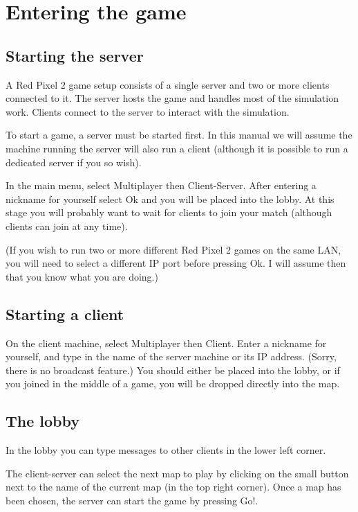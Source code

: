 \documentclass[a4paper]{article}
\begin{document}
\section{Entering the game}


\subsection{Starting the server}

A Red Pixel 2 game setup consists of a single server and two or more
clients connected to it.  The server hosts the game and handles most
of the simulation work.  Clients connect to the server to interact
with the simulation.

To start a game, a server must be started first.  In this manual we
will assume the machine running the server will also run a client
(although it is possible to run a dedicated server if you so wish).

In the main menu, select \textsf{Multiplayer} then
\textsf{Client-Server}.  After entering a nickname for yourself select
\textsf{Ok} and you will be placed into the lobby.  At this stage you
will probably want to wait for clients to join your match (although
clients can join at any time).

(If you wish to run two or more different Red Pixel 2 games on the
same LAN, you will need to select a different IP port before pressing
\textsf{Ok}.  I will assume then that you know what you are doing.)


\subsection{Starting a client}

On the client machine, select \textsf{Multiplayer} then
\textsf{Client}.  Enter a nickname for yourself, and type in the name
of the server machine or its IP address.  (Sorry, there is no
broadcast feature.)  You should either be placed into the lobby, or if
you joined in the middle of a game, you will be dropped directly into
the map.


\subsection{The lobby}

In the lobby you can type messages to other clients in the lower left
corner.

The client-server can select the next map to play by clicking on the
small button next to the name of the current map (in the top right
corner).  Once a map has been chosen, the server can start the game by
pressing \textsf{Go!}.
\end{document}
